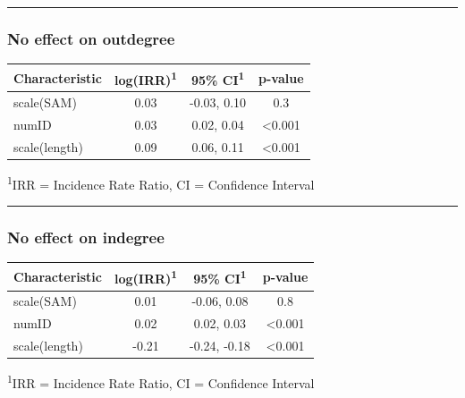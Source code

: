 \documentclass[
  .7em,
  letterpaper,
  DIV=11,
  numbers=noendperiod]{scrartcl}
\begin{document}
\begin{center}\rule{0.5\linewidth}{0.5pt}\end{center}

\hypertarget{no-effect-on-outdegree-4}{%
\subsubsection{No effect on outdegree}\label{no-effect-on-outdegree-4}}

\captionsetup[table]{labelformat=empty,skip=1pt}
\setlength{\LTpost}{0mm}
\begin{longtable}{lccc}
\toprule
\textbf{Characteristic} & \textbf{log(IRR)}\textsuperscript{1} & \textbf{95\% CI}\textsuperscript{1} & \textbf{p-value} \\ 
\midrule
scale(SAM) & 0.03 & -0.03, 0.10 & 0.3 \\ 
numID & 0.03 & 0.02, 0.04 & <0.001 \\ 
scale(length) & 0.09 & 0.06, 0.11 & <0.001 \\ 
\bottomrule
\end{longtable}
\begin{minipage}{\linewidth}
\textsuperscript{1}IRR = Incidence Rate Ratio, CI = Confidence Interval\\
\end{minipage}

\begin{center}\rule{0.5\linewidth}{0.5pt}\end{center}

\hypertarget{no-effect-on-indegree-3}{%
\subsubsection{No effect on indegree}\label{no-effect-on-indegree-3}}

\captionsetup[table]{labelformat=empty,skip=1pt}
\setlength{\LTpost}{0mm}
\begin{longtable}{lccc}
\toprule
\textbf{Characteristic} & \textbf{log(IRR)}\textsuperscript{1} & \textbf{95\% CI}\textsuperscript{1} & \textbf{p-value} \\ 
\midrule
scale(SAM) & 0.01 & -0.06, 0.08 & 0.8 \\ 
numID & 0.02 & 0.02, 0.03 & <0.001 \\ 
scale(length) & -0.21 & -0.24, -0.18 & <0.001 \\ 
\bottomrule
\end{longtable}
\begin{minipage}{\linewidth}
\textsuperscript{1}IRR = Incidence Rate Ratio, CI = Confidence Interval\\
\end{minipage}
\end{document}

